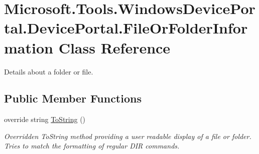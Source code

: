 \hypertarget{class_microsoft_1_1_tools_1_1_windows_device_portal_1_1_device_portal_1_1_file_or_folder_information}{}\section{Microsoft.\+Tools.\+Windows\+Device\+Portal.\+Device\+Portal.\+File\+Or\+Folder\+Information Class Reference}
\label{class_microsoft_1_1_tools_1_1_windows_device_portal_1_1_device_portal_1_1_file_or_folder_information}


Details about a folder or file.  


\subsection*{Public Member Functions}
\begin{DoxyCompactItemize}
\item 
override string \hyperlink{class_microsoft_1_1_tools_1_1_windows_device_portal_1_1_device_portal_1_1_file_or_folder_information_afb781a1d811e1e214e5921b216f56c6e}{To\+String} ()
\begin{DoxyCompactList}\small\item\em Overridden To\+String method providing a user readable display of a file or folder. Tries to match the formatting of regular D\+IR commands. \end{DoxyCompactList}\end{DoxyCompactItemize}
